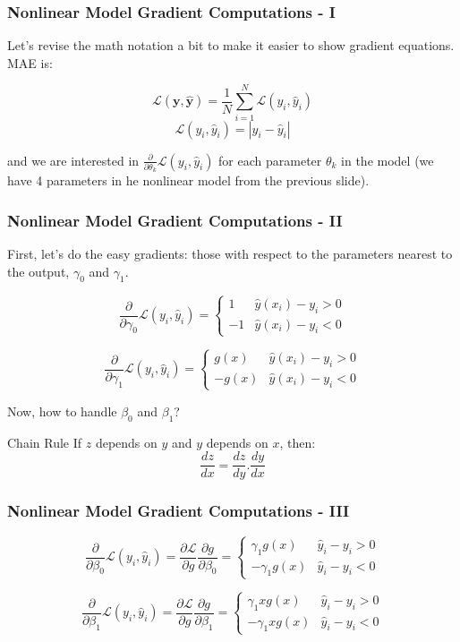 \documentclass{beamer}
\begin{document}
\begin{frame}
\frametitle{Nonlinear Model Gradient Computations - I}

Let's revise the math notation a bit to make it easier to show gradient equations. MAE is:

\[
\mathcal{L}(\mathbf{y},\hat{\mathbf{y}})=\frac{1}{N}\sum_{i=1}^{N}\mathcal{L}(y_{i},\hat{y}_{i})
\]
\[
\mathcal{L}(y_{i},\hat{y}_{i})=\left|y_{i}-\hat{y}_{i}\right|
\]

\hfill 

and we are interested in $\frac{\partial}{\partial\theta_{k}}\mathcal{L}(y_{i},\hat{y}_{i})$ for each parameter $\theta_k$ in the model (we have 4 parameters in he nonlinear model from the previous slide).

\end{frame}

\begin{frame}
\frametitle{Nonlinear Model Gradient Computations - II}

First, let's do the easy gradients: those with respect to the parameters nearest to the output, $\gamma_0$ and $\gamma_1$.

\[
\frac{\partial}{\partial\gamma_{0}}\mathcal{L}(y_{i},\hat{y}_{i})=\begin{cases}
1 & \hat{y}(x_{i})-y_{i}>0\\
-1 & \hat{y}(x_{i})-y_{i}<0
\end{cases}
\]

\[
\frac{\partial}{\partial\gamma_{1}}\mathcal{L}(y_{i},\hat{y}_{i})=\begin{cases}
g(x) & \hat{y}(x_{i})-y_{i}>0\\
-g(x) & \hat{y}(x_{i})-y_{i}<0
\end{cases}
\]

Now, how to handle $\beta_0$ and $\beta_1$?

\begin{block}{Chain Rule}
If $z$ depends on $y$ and $y$ depends on $x$, then:
\[
\frac{dz}{dx}=\frac{dz}{dy}.\frac{dy}{dx}
\]
\end{block}

\end{frame}

\begin{frame}
\frametitle{Nonlinear Model Gradient Computations - III}

\[
\frac{\partial}{\partial\beta_{0}}\mathcal{L}(y_{i},\hat{y}_{i})=\frac{\partial\mathcal{L}}{\partial g}\frac{\partial g}{\partial\beta_{0}}=\begin{cases}
\gamma_{1}g(x) & \hat{y}_{i}-y_{i}>0\\
-\gamma_{1}g(x) & \hat{y}_{i}-y_{i}<0
\end{cases}
\]

\[
\frac{\partial}{\partial\beta_{1}}\mathcal{L}(y_{i},\hat{y}_{i})=\frac{\partial\mathcal{L}}{\partial g}\frac{\partial g}{\partial\beta_{1}}=\begin{cases}
\gamma_{1}xg(x) & \hat{y}_{i}-y_{i}>0\\
-\gamma_{1}xg(x) & \hat{y}_{i}-y_{i}<0
\end{cases}
\]

\end{frame}
\end{document}
